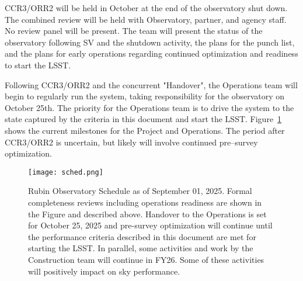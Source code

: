 CCR3/ORR2 will be held in October at the end of the observatory shut down. The combined review will be held with Observatory, partner, and agency staff. No review panel will be present. The team will present the status of the observatory following SV and the shutdown activity, the plans for the punch list, and the plans for early operations regarding continued optimization and readiness to start the LSST.

Following CCR3/ORR2 and the concurrent "Handover", the Operations team will begin to regularly run the system, taking responsibility for the observatory on October 25th. The priority for the Operations team is to drive the system to the state captured by the criteria in this document and start the LSST. Figure~\ref{sched} shows the current milestones for the Project and Operations. The period after CCR3/ORR2 is uncertain, but likely will involve continued pre--survey optimization. 

\begin{figure}%
  \centering
\texttt{[image: sched.png]}
\caption{Rubin Observatory Schedule as of September 01, 2025. Formal completeness reviews including operations readiness are shown in the Figure and described above. Handover to the Operations is set for October 25, 2025 and pre-survey optimization will continue until the performance criteria described in this document are met for starting the LSST. In parallel, some activities and work by the Construction team will continue in FY26. Some of these activities will positively impact on sky performance. }
\label{sched}
\end{figure}

\newpage
